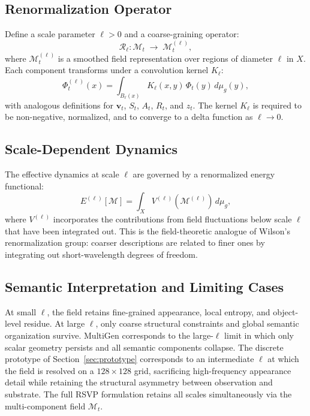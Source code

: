 \documentclass[11pt]{article}
\begin{document}
\subsection{Renormalization Operator}

Define a scale parameter $\ell > 0$ and a coarse-graining operator:
\[
\mathcal{R}_\ell : \mathcal{M}_t \;\longrightarrow\; \mathcal{M}_t^{(\ell)},
\]
where $\mathcal{M}_t^{(\ell)}$ is a smoothed field representation over
regions of diameter $\ell$ in $X$.
Each component transforms under a convolution kernel $K_\ell$:
\[
\Phi_t^{(\ell)}(x)
= \int_{B_\ell(x)} K_\ell(x,y)\,\Phi_t(y)\,d\mu_g(y),
\]
with analogous definitions for $\mathbf{v}_t$, $S_t$, $A_t$, $R_t$, and
$z_t$.
The kernel $K_\ell$ is required to be non-negative, normalized, and to
converge to a delta function as $\ell \to 0$.

\subsection{Scale-Dependent Dynamics}

The effective dynamics at scale $\ell$ are governed by a renormalized
energy functional:
\[
E^{(\ell)}[\mathcal{M}]
=
\int_X V^{(\ell)}(\mathcal{M}^{(\ell)})\, d\mu_g,
\]
where $V^{(\ell)}$ incorporates the contributions from field fluctuations
below scale $\ell$ that have been integrated out.
This is the field-theoretic analogue of Wilson's renormalization group:
coarser descriptions are related to finer ones by integrating out
short-wavelength degrees of freedom.

\subsection{Semantic Interpretation and Limiting Cases}

At small $\ell$, the field retains fine-grained appearance, local entropy,
and object-level residue.
At large $\ell$, only coarse structural constraints and global semantic
organization survive.
MultiGen corresponds to the large-$\ell$ limit in which only scalar
geometry persists and all semantic components collapse.
The discrete prototype of Section~\ref{sec:prototype} corresponds to an
intermediate $\ell$ at which the field is resolved on a $128 \times 128$
grid, sacrificing high-frequency appearance detail while retaining the
structural asymmetry between observation and substrate.
The full RSVP formulation retains all scales simultaneously via the
multi-component field $\mathcal{M}_t$.
\end{document}
